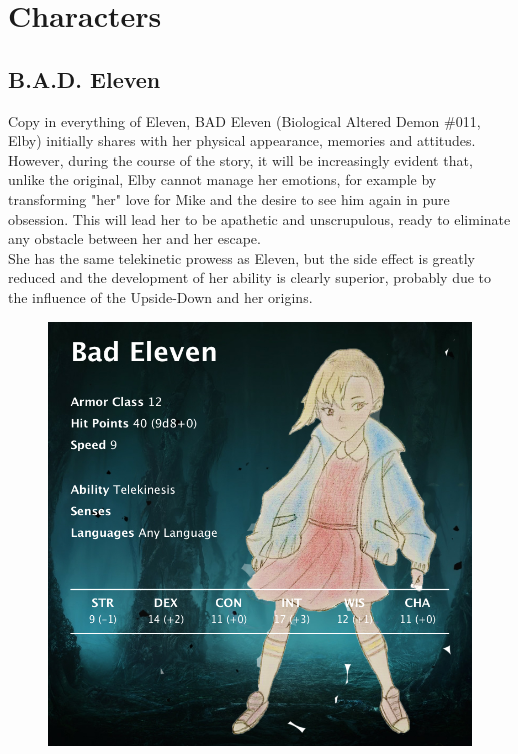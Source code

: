 \section{Characters}

\subsection{B.A.D. Eleven}
Copy in everything of Eleven, BAD Eleven (Biological Altered Demon \#011, Elby) initially shares with her physical appearance, memories and attitudes.
However, during the course of the story, it will be increasingly evident that, unlike the original, Elby cannot manage her emotions, for example by transforming "her" love for Mike and the desire to see him again in pure obsession. This will lead her to be apathetic and unscrupulous, ready to eliminate any obstacle between her and her escape.\\
She has the same telekinetic prowess as Eleven, but the side effect is greatly reduced and the development of her ability is clearly superior, probably due to the influence of the Upside-Down and her origins.

\vspace*{0.5cm}

\begin{figure}[H]
	\centering
	\includegraphics[width=0.7\linewidth]{images/visual_stats/badeleven.png}
\end{figure}



